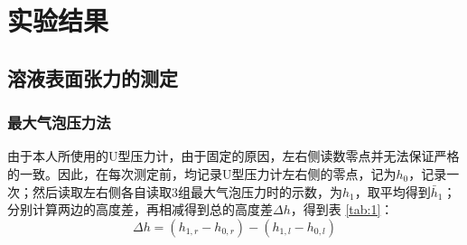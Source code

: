\section{实验结果}

\subsection{溶液表面张力的测定}

\subsubsection{最大气泡压力法}

由于本人所使用的U型压力计，由于固定的原因，左右侧读数零点并无法保证严格的一致。因此，在每次测定前，均记录U型压力计左右侧的零点，记为$h_{0}$，记录一次；然后读取左右侧各自读取3组最大气泡压力时的示数，为$h_{1}$，取平均得到$\bar{h}_1$；分别计算两边的高度差，再相减得到总的高度差$\Delta h$，得到表 \ref{tab:1}：
\begin{equation}\label{eq:3}
    \Delta h = (h_{1,r} - h_{0,r}) - (h_{1,l} - h_{0, l})
\end{equation}


